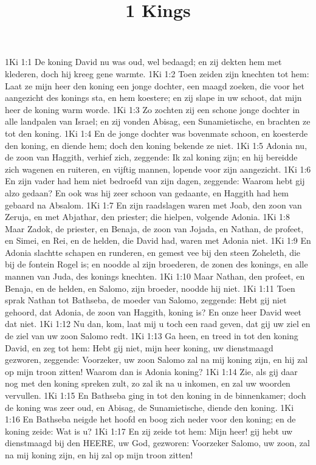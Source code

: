 

\title{1 Kings}


1Ki 1:1  De koning David nu was oud, wel bedaagd; en zij dekten hem met klederen, doch hij kreeg gene warmte.
1Ki 1:2  Toen zeiden zijn knechten tot hem: Laat ze mijn heer den koning een jonge dochter, een maagd zoeken, die voor het aangezicht des konings sta, en hem koestere; en zij slape in uw schoot, dat mijn heer de koning warm worde.
1Ki 1:3  Zo zochten zij een schone jonge dochter in alle landpalen van Israel; en zij vonden Abisag, een Sunamietische, en brachten ze tot den koning.
1Ki 1:4  En de jonge dochter was bovenmate schoon, en koesterde den koning, en diende hem; doch den koning bekende ze niet.
1Ki 1:5  Adonia nu, de zoon van Haggith, verhief zich, zeggende: Ik zal koning zijn; en hij bereidde zich wagenen en ruiteren, en vijftig mannen, lopende voor zijn aangezicht.
1Ki 1:6  En zijn vader had hem niet bedroefd van zijn dagen, zeggende: Waarom hebt gij alzo gedaan? En ook was hij zeer schoon van gedaante, en Haggith had hem gebaard na Absalom.
1Ki 1:7  En zijn raadslagen waren met Joab, den zoon van Zeruja, en met Abjathar, den priester; die hielpen, volgende Adonia.
1Ki 1:8  Maar Zadok, de priester, en Benaja, de zoon van Jojada, en Nathan, de profeet, en Simei, en Rei, en de helden, die David had, waren met Adonia niet.
1Ki 1:9  En Adonia slachtte schapen en runderen, en gemest vee bij den steen Zoheleth, die bij de fontein Rogel is; en noodde al zijn broederen, de zonen des konings, en alle mannen van Juda, des konings knechten.
1Ki 1:10  Maar Nathan, den profeet, en Benaja, en de helden, en Salomo, zijn broeder, noodde hij niet.
1Ki 1:11  Toen sprak Nathan tot Bathseba, de moeder van Salomo, zeggende: Hebt gij niet gehoord, dat Adonia, de zoon van Haggith, koning is? En onze heer David weet dat niet.
1Ki 1:12  Nu dan, kom, laat mij u toch een raad geven, dat gij uw ziel en de ziel van uw zoon Salomo redt.
1Ki 1:13  Ga heen, en treed in tot den koning David, en zeg tot hem: Hebt gij niet, mijn heer koning, uw dienstmaagd gezworen, zeggende: Voorzeker, uw zoon Salomo zal na mij koning zijn, en hij zal op mijn troon zitten! Waarom dan is Adonia koning?
1Ki 1:14  Zie, als gij daar nog met den koning spreken zult, zo zal ik na u inkomen, en zal uw woorden vervullen.
1Ki 1:15  En Bathseba ging in tot den koning in de binnenkamer; doch de koning was zeer oud, en Abisag, de Sunamietische, diende den koning.
1Ki 1:16  En Bathseba neigde het hoofd en boog zich neder voor den koning; en de koning zeide: Wat is u?
1Ki 1:17  En zij zeide tot hem: Mijn heer! gij hebt uw dienstmaagd bij den HEERE, uw God, gezworen: Voorzeker Salomo, uw zoon, zal na mij koning zijn, en hij zal op mijn troon zitten!
